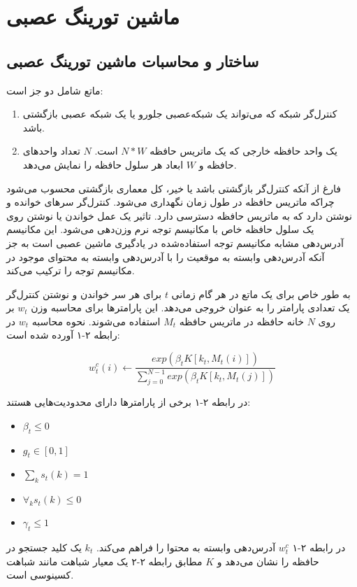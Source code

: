 \chapter{ماشین تورینگ عصبی}
\section{ساختار و محاسبات ماشین تورینگ عصبی}
ماتع شامل دو جز است:
\begin{enumerate}
\item کنترل‌گر شبکه که می‌تواند یک شبکه‌عصبی جلورو یا یک شبکه عصبی بازگشتی باشد.
\item یک واحد حافظه خارجی که یک ماتریس حافظه $N*W$ است. $N$ تعداد واحد‌های حافظه و $W$ ابعاد هر سلول حافظه را نمایش می‌دهد.
\end{enumerate}

فارغ از آنکه کنترل‌گر بازگشتی باشد یا خیر، کل معماری بازگشتی محسوب می‌شود چراکه ماتریس حافظه در طول زمان نگهداری می‌شود. کنترل‌گر سرهای خوانده و نوشتن دارد که به ماتریس حافظه دسترسی دارد. تاثیر یک عمل خواندن یا نوشتن روی یک سلول حافظه خاص با مکانیسم توجه نرم وزن‌دهی می‌شود. این مکانیسم آدرس‌دهی مشابه مکانیسم توجه استفاده‌شده در یادگیری ماشین عصبی است به جز آنکه آدرس‌دهی وابسته به موقعیت را با آدرس‌دهی وابسته به محتوای موجود در مکانیسم توجه  را ترکیب می‌کند.

به طور خاص برای یک ماتع در هر گام زمانی $t$ برای هر سر خواندن و نوشتن کنترل‌گر یک تعدادی پارامتر را به عنوان خروجی می‌دهد. این پارامتر‌ها برای محاسبه وزن $w_t$ بر روی $N$ خانه حافظه در ماتریس حافظه $M_t$ استفاده می‌شوند. نحوه محاسبه $w_t$ در رابطه ۲-۱ آورده شده است:

\begin{equation}
w^c_t(i) \leftarrow \frac{exp(\beta_t K[k_t,M_t(i)])}{\sum_{j=0}^{N-1} exp(\beta_t K[k_t,M_t(j)])}
\end{equation}

در رابطه ۲-۱ برخی از پارامترها دارای محدودیت‌هایی هستند:
\begin{itemize}
\item $\beta_t \le 0$
\item $g_t \in [0, 1]$
\item $\sum_k s_t(k) = 1$
\item $\forall_k s_t(k) \le 0$
\item $\gamma_t \le 1$
\end{itemize}

در رابطه ۲-۱ $w_t^c$ آدرس‌دهی وابسته به محتوا را فراهم می‌کند. $k_t$ یک کلید جستجو در حافظه را نشان می‌دهد و $K$ مطابق رابطه ۲-۲ یک معیار شباهت مانند شباهت کسینوسی است.

